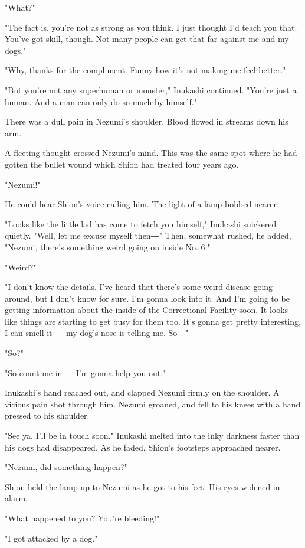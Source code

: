 "What?"

"The fact is, you're not as strong as you think. I just thought I'd
teach you that. You've got skill, though. Not many people can get that
far against me and my dogs."

"Why, thanks for the compliment. Funny how it's not making me feel
better."

"But you're not any superhuman or monster," Inukashi continued. "You're
just a human. And a man can only do so much by himself."

There was a dull pain in Nezumi's shoulder. Blood flowed in streams down
his arm.

A fleeting thought crossed Nezumi's mind. This was the same spot where
he had gotten the bullet wound which Shion had treated four years ago.

"Nezumi!"

He could hear Shion's voice calling him. The light of a lamp bobbed
nearer.

"Looks like the little lad has come to fetch you himself," Inukashi
snickered quietly. "Well, let me excuse myself then―" Then, somewhat
rushed, he added, "Nezumi, there's something weird going on inside No.
6."

"Weird?"

"I don't know the details. I've heard that there's some weird disease
going around, but I don't know for sure. I'm gonna look into it. And I'm
going to be getting information about the inside of the Correctional
Facility soon. It looks like things are starting to get busy for them
too. It's gonna get pretty interesting, I can smell it ― my dog's nose
is telling me. So―"

"So?"

"So count me in ― I'm gonna help you out."

Inukashi's hand reached out, and clapped Nezumi firmly on the shoulder.
A vicious pain shot through him. Nezumi groaned, and fell to his knees
with a hand pressed to his shoulder.

"See ya. I'll be in touch soon." Inukashi melted into the inky darkness
faster than his dogs had disappeared. As he faded, Shion's footsteps
approached nearer.

"Nezumi, did something happen?"

Shion held the lamp up to Nezumi as he got to his feet. His eyes widened
in alarm.

"What happened to you? You're bleeding!"

"I got attacked by a dog."


